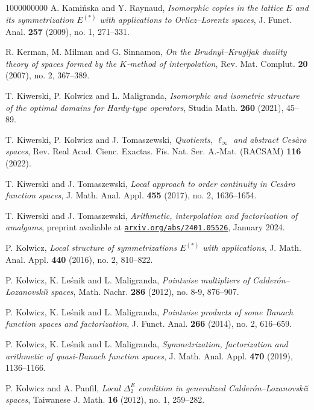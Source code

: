 \documentclass[11pt]{amsart}
\theoremstyle{definition}
\theoremstyle{definition}
\theoremstyle{definition}
\theoremstyle{definition}
\theoremstyle{definition}
\theoremstyle{definition}
\theoremstyle{definition}
\theoremstyle{definition}
\numberwithin{equation}{section}
\numberwithin{equation}{section}
\numberwithin{equation}{section}
\theoremstyle{definition}
\theoremstyle{definition}
\theoremstyle{definition}
\theoremstyle{definition}
\theoremstyle{definition}
\theoremstyle{definition}
\begin{document}
\begin{thebibliography}{1000000000}
	 A. Kami{\' n}ska and Y. Raynaud, {\it Isomorphic copies in the lattice $E$ and its symmetrization $E^{(*)}$ with applications to Orlicz--Lorentz spaces},
		J. Funct. Anal. {\bf 257} (2009), no. 1, 271--331.
		
	 R. Kerman, M. Milman and G. Sinnamon, {\it On the Brudny{\u \i}--Krugljak duality theory of spaces formed by the $K$-method of interpolation},
		Rev. Mat. Complut. {\bf 20} (2007), no. 2, 367--389.
		
	 T. Kiwerski, P. Kolwicz and L. Maligranda, {\it Isomorphic and isometric structure of the optimal domains for Hardy-type operators},
		Studia Math. {\bf 260} (2021), 45--89.
	
	 T. Kiwerski, P. Kolwicz and J. Tomaszewski, {\it Quotients, $\ell_\infty$ and abstract Ces\`aro spaces}, Rev. Real Acad. Cienc.
		Exactas. F{\' i}s. Nat. Ser. A.-Mat. (RACSAM) {\bf 116} (2022).
	
	  T. Kiwerski and J. Tomaszewski, {\it Local approach to order continuity in Ces{\` a}ro function spaces}, J. Math. Anal. Appl.
		{\bf 455} (2017), no. 2, 1636--1654.
		
	 T. Kiwerski and J. Tomaszewski, {\it Arithmetic, interpolation and factorization of amalgams},
	preprint avaliable at \href{https://arxiv.org/abs/2401.05526}{\texttt{arxiv.org/abs/2401.05526}}, January 2024.
	
	 P. Kolwicz, {\it Local structure of symmetrizations $E^{(*)}$ with applications}, J. Math. Anal. Appl. {\bf 440} (2016), no. 2, 810--822.
		
	 P. Kolwicz, K. Le\'{s}nik and L. Maligranda, {\it Pointwise multipliers of Calder{\' o}n--Lozanovski{\u \i} spaces},
	Math. Nachr. {\bf 286} (2012), no. 8-9, 876--907.
	
	 P. Kolwicz, K. Le\'{s}nik and L. Maligranda, {\it Pointwise products of some Banach function spaces and factorization}, J. Funct. Anal. {\bf 266} (2014),
		no. 2, 616--659.
		
	 P. Kolwicz, K. Le\'{s}nik and L. Maligranda, \textit{Symmetrization, factorization and arithmetic of quasi-Banach function spaces},
	J. Math. Anal. Appl. {\bf 470} (2019), 1136--1166.
		
	 P. Kolwicz and A. Panfil, {\it Local $\Delta_2^E$ condition in generalized Calder{\' o}n--Lozanovski{\u \i} spaces},
		Taiwanese J. Math. {\bf 16} (2012), no. 1, 259--282.
		

\end{thebibliography}
\end{document}
